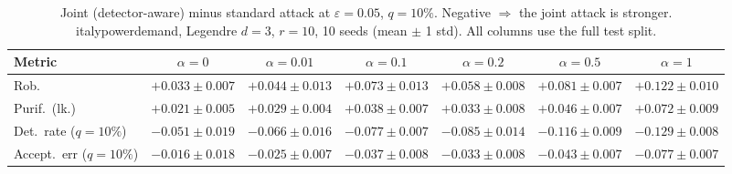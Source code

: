 \begin{table}[htbp]
  \centering
  \small
  \begin{tabular}{@{}lcccccc@{}}
    \toprule
    Metric & $\alpha{=}0$ & $\alpha{=}0.01$ & $\alpha{=}0.1$ & $\alpha{=}0.2$ & $\alpha{=}0.5$ & $\alpha{=}1$ \\
    \midrule
    Rob. & $+0.033 \pm 0.007$ & $+0.044 \pm 0.013$ & $+0.073 \pm 0.013$ & $+0.058 \pm 0.008$ & $+0.081 \pm 0.007$ & $+0.122 \pm 0.010$ \\
    Purif.\ (lk.) & $+0.021 \pm 0.005$ & $+0.029 \pm 0.004$ & $+0.038 \pm 0.007$ & $+0.033 \pm 0.008$ & $+0.046 \pm 0.007$ & $+0.072 \pm 0.009$ \\
    Det.\ rate ($q{=}10\%$) & $-0.051 \pm 0.019$ & $-0.066 \pm 0.016$ & $-0.077 \pm 0.007$ & $-0.085 \pm 0.014$ & $-0.116 \pm 0.009$ & $-0.129 \pm 0.008$ \\
    Accept.\ err ($q{=}10\%$) & $-0.016 \pm 0.018$ & $-0.025 \pm 0.007$ & $-0.037 \pm 0.008$ & $-0.033 \pm 0.008$ & $-0.043 \pm 0.007$ & $-0.077 \pm 0.007$ \\
    \bottomrule
  \end{tabular}
  \caption{Joint (detector-aware) minus standard attack at $\varepsilon=0.05$, $q{=}10\%$. Negative $\Rightarrow$ the joint attack is stronger. italypowerdemand, Legendre $d{=}3$, $r{=}10$, 10 seeds (mean $\pm$ 1 std). All columns use the full test split.}
  \label{tab:italypowerdemand_joint_r10_eps0.05}
\end{table}
